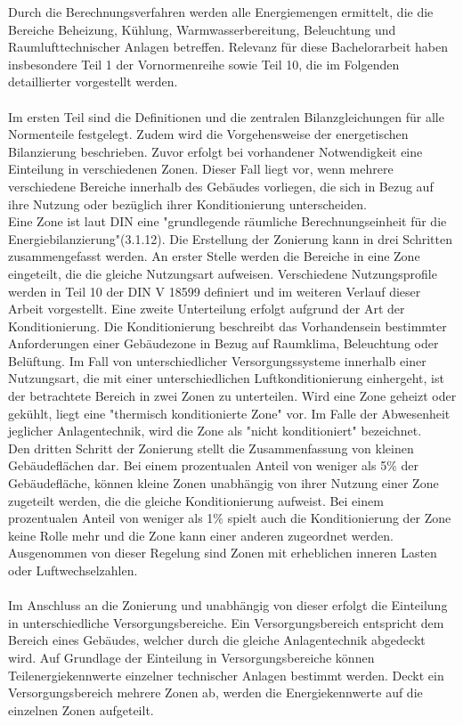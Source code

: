 Durch die Berechnungsverfahren werden alle Energiemengen ermittelt, die die Bereiche Beheizung, Kühlung, Warmwasserbereitung, Beleuchtung und Raumlufttechnischer Anlagen betreffen. Relevanz für diese Bachelorarbeit haben insbesondere Teil 1 der Vornormenreihe sowie Teil 10, die im Folgenden detaillierter vorgestellt werden. \\
\\
Im ersten Teil sind die Definitionen und die zentralen Bilanzgleichungen für alle Normenteile festgelegt. Zudem wird die Vorgehensweise der energetischen Bilanzierung beschrieben. Zuvor erfolgt bei vorhandener Notwendigkeit eine Einteilung in verschiedenen Zonen. Dieser Fall liegt vor, wenn mehrere verschiedene Bereiche innerhalb des Gebäudes vorliegen, die sich in Bezug auf ihre Nutzung oder bezüglich ihrer Konditionierung unterscheiden.\\
Eine Zone ist laut DIN eine "grundlegende räumliche Berechnungseinheit für die Energiebilanzierung"(3.1.12). Die Erstellung der Zonierung kann in drei Schritten zusammengefasst werden. An erster Stelle werden die Bereiche in eine Zone eingeteilt, die die gleiche Nutzungsart aufweisen. Verschiedene Nutzungsprofile werden in Teil 10 der DIN V 18599 definiert und im weiteren Verlauf dieser Arbeit vorgestellt. Eine zweite Unterteilung erfolgt aufgrund der Art der Konditionierung. Die Konditionierung beschreibt das Vorhandensein bestimmter Anforderungen einer Gebäudezone in Bezug auf Raumklima, Beleuchtung oder Belüftung. Im Fall von unterschiedlicher Versorgungssysteme innerhalb einer Nutzungsart, die mit einer unterschiedlichen Luftkonditionierung einhergeht, ist der betrachtete Bereich in zwei Zonen zu unterteilen. Wird eine Zone geheizt oder gekühlt, liegt eine "thermisch konditionierte Zone" vor. Im Falle der Abwesenheit jeglicher Anlagentechnik, wird die Zone als "nicht konditioniert" bezeichnet. \\
Den dritten Schritt der Zonierung stellt die Zusammenfassung von kleinen Gebäudeflächen dar. Bei einem prozentualen Anteil von weniger als 5\% der Gebäudefläche, können kleine Zonen unabhängig von ihrer Nutzung einer Zone zugeteilt werden, die die gleiche Konditionierung aufweist. Bei einem prozentualen Anteil von weniger als 1\% spielt auch die Konditionierung der Zone keine Rolle mehr und die Zone kann einer anderen zugeordnet werden. Ausgenommen von dieser Regelung sind Zonen mit erheblichen inneren Lasten oder Luftwechselzahlen.\\
\\
Im Anschluss an die Zonierung und unabhängig von dieser erfolgt die Einteilung in unterschiedliche Versorgungsbereiche. Ein Versorgungsbereich entspricht dem Bereich eines Gebäudes, welcher durch die gleiche Anlagentechnik abgedeckt wird. Auf Grundlage der Einteilung in Versorgungsbereiche können Teilenergiekennwerte einzelner technischer Anlagen bestimmt werden. Deckt ein Versorgungsbereich mehrere Zonen ab, werden die Energiekennwerte auf die einzelnen Zonen aufgeteilt. \\
